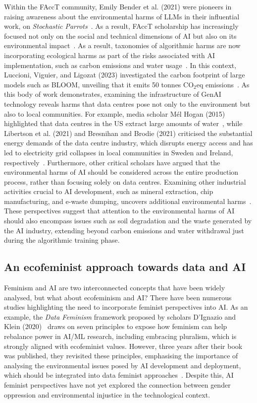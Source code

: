 Within the FAccT community, Emily Bender et al. (2021) were pioneers in raising awareness about the environmental harms of LLMs in their influential work, on \textit{Stochastic Parrots}~\cite{bender2021stochastic}. As a result, FAccT scholarship has increasingly focused not only on the social and technical dimensions of AI but also on its environmental impact~\cite{Rakova2023}. As a result, taxonomies of algorithmic harms are now incorporating ecological harms as part of the risks associated with AI implementation, such as carbon emissions and water usage~\cite{Kneese2024, dodge2022carbon_ai}.  In this context, Luccioni, Viguier, and Ligozat (2023) investigated the carbon footprint of large models such as BLOOM, unveiling that it emits 50 tonnes CO$_2$eq emissions~\cite{Luccioni2023}. As this body of work demonstrates, examining the infrastructure of GenAI technology reveals harms that data centres pose not only to the environment but also to local communities. For example, media scholar Mél Hogan (2015) highlighted that data centres in the US extract large amounts of water~\cite{hogan2015data}, while Libertson et al. (2021) and Bresnihan and Brodie (2021) criticised the substantial energy demands of the data centre industry, which disrupts energy access and has led to electricity grid collapses in local communities in Sweden and Ireland, respectively~\cite{Libertson2021, bresnihan2021extractive}. Furthermore, other critical scholars have argued that the environmental harms of AI should be considered across the entire production process, rather than focusing solely on data centres. Examining other industrial activities crucial to AI development, such as mineral extraction, chip manufacturing, and e-waste dumping, uncovers additional environmental harms~\cite{Valdivia2024a, Taffel2021}. These perspectives suggest that attention to the environmental harms of AI should also encompass issues such as soil degradation and the waste generated by the AI industry, extending beyond carbon emissions and water withdrawal just during the algorithmic training phase.


\subsection{An ecofeminist approach towards data and AI}

Feminism and AI are two interconnected concepts that have been widely analysed, but what about ecofeminism and AI? There have been numerous studies highlighting the need to incorporate feminist perspectives into AI. As an example, the \textit{Data Feminism} framework proposed by scholars D'Ignazio and Klein (2020)~\cite{dignazio2020data_feminism} draws on seven principles to expose how feminism can help rebalance power in AI/ML research, including embracing pluralism, which is strongly aligned with ecofeminist values. However, three years after their book was published, they revisited these principles, emphasising the importance of analysing the environmental issues posed by AI development and deployment, which should be integrated into data feminist approaches~\cite{Klein2024}. Despite this, AI feminist perspectives have not yet explored the connection between gender oppression and environmental injustice in the technological context. 

